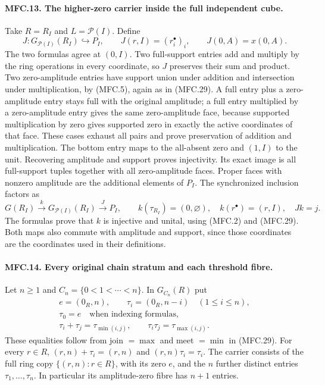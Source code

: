 \paragraph{MFC.13. The higher-zero carrier inside the full independent cube.}
Take \(R=R_I\) and \(L=\mathcal P(I)\). Define
\[
 J:G_{\mathcal P(I)}(R_I)\hookrightarrow P_I,\qquad
 J(r,I)=(r_i^\bullet)_i,\qquad
 J(0,A)=x(0,A).                                          \tag{MFC.33}
\]
The two formulas agree at \((0,I)\).
Two full-support entries add and multiply by the ring
operations in every coordinate, so \(J\) preserves their
sum and product. Two zero-amplitude entries have support
union under addition and intersection under multiplication,
by (MFC.5), again as in (MFC.29).
A full entry plus a zero-amplitude entry stays full with
the original amplitude; a full entry multiplied by a
zero-amplitude entry gives the same zero-amplitude face,
because supported multiplication by zero gives supported
zero in exactly the active coordinates of that face.
These cases exhaust all pairs and prove preservation
of addition and multiplication. The bottom entry maps
to the all-absent zero and \((1,I)\) to the unit.
Recovering amplitude and support proves injectivity.
Its exact image is all full-support tuples together
with all zero-amplitude faces. Proper faces with nonzero
amplitude are the additional elements of \(P_I\).
The synchronized inclusion factors as
\[
 G(R_I)\xrightarrow{\ k\ }G_{\mathcal P(I)}(R_I)
                 \xrightarrow{\ J\ }P_I,\qquad
 k(\tau_{R_I})=(0,\varnothing),\quad
 k(r^\bullet)=(r,I),\quad Jk=j.                           \tag{MFC.34}
\]
The formulas prove that \(k\) is injective and unital,
using (MFC.2) and (MFC.29). Both maps also commute
with amplitude and support, since those coordinates
are the coordinates used in their definitions.

\paragraph{MFC.14. Every original chain stratum and each threshold fibre.}
Let \(n\ge1\) and \(C_n=\{0<1<\cdots<n\}\).
In \(G_{C_n}(R)\) put
\[
 \begin{gathered}
 e=(0_R,n),\qquad \tau_i=(0_R,n-i)\quad(1\le i\le n),\\
 \tau_0=e\quad\text{when indexing formulas},\\
 \tau_i+\tau_j=\tau_{\min(i,j)},\qquad
 \tau_i\tau_j=\tau_{\max(i,j)} .
 \end{gathered}                                          \tag{MFC.35}
\]
These equalities follow from join \(=\max\) and meet \(=\min\)
in (MFC.29). For every \(r\in R\),
\((r,n)+\tau_i=(r,n)\) and \((r,n)\tau_i=\tau_i\).
The carrier consists of the full ring copy
\(\{(r,n):r\in R\}\), with its zero \(e\), and the
\(n\) further distinct entries \(\tau_1,\ldots,\tau_n\).
In particular its amplitude-zero fibre has \(n+1\) entries.

